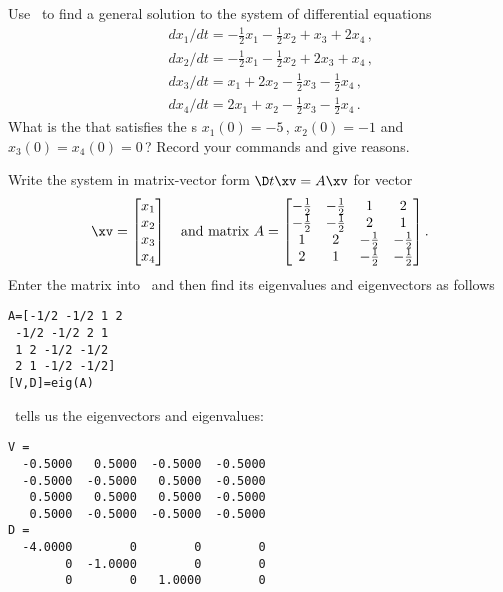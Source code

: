 \begin{example} \label{eg:}
Use \script\ to find a general solution to the system of differential equations
\begin{eqnarray*}
&&dx_1/dt=-\tfrac12x_1-\tfrac12x_2+x_3+2x_4\,, 
\\&&dx_2/dt=-\tfrac12x_1-\tfrac12x_2+2x_3+x_4\,, 
\\&&dx_3/dt=x_1+2x_2-\tfrac12x_3-\tfrac12x_4\,,  
\\&&dx_4/dt=2x_1+x_2-\tfrac12x_3-\tfrac12x_4\,.
\end{eqnarray*}
What is the  that satisfies the s \(x_1(0)=-5\)\,, \(x_2(0)=-1\) and \(x_3(0)=x_4(0)=0\)\,?
Record your commands and give reasons.
\begin{solution} 
Write the system in matrix-vector form \(\D t\xv=A\xv\) for vector 
\begin{equation*}
\xv=\begin{bmatrix} x_1\\x_2\\x_3\\x_4 \end{bmatrix}
\quad\text{and matrix }
A=\begin{bmatrix} -\tfrac12 & -\tfrac12 & 1 & 2
\\-\tfrac12 & -\tfrac12 & 2 & 1
\\1 & 2 & -\tfrac12 & -\tfrac12
\\2 & 1 & -\tfrac12 & -\tfrac12 \end{bmatrix}.
\end{equation*}
Enter the matrix into \script\ and then find its eigenvalues and eigenvectors as follows
\begin{verbatim}
A=[-1/2 -1/2 1 2
 -1/2 -1/2 2 1
 1 2 -1/2 -1/2
 2 1 -1/2 -1/2]
[V,D]=eig(A)
\end{verbatim}
\setbox\ajrqrbox\hbox{}\marginpar{\usebox{\ajrqrbox}}%
\script\ tells us the eigenvectors and eigenvalues:
\begin{verbatim}
V =
  -0.5000   0.5000  -0.5000  -0.5000
  -0.5000  -0.5000   0.5000  -0.5000
   0.5000   0.5000   0.5000  -0.5000
   0.5000  -0.5000  -0.5000  -0.5000
D =
  -4.0000        0        0        0
        0  -1.0000        0        0
        0        0   1.0000        0

\end{verbatim}
\end{solution}
\end{example}
